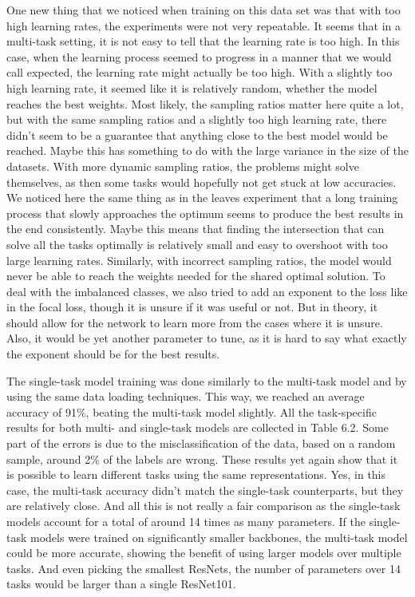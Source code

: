 One new thing that we noticed when training on this data set was that with too high learning rates, the experiments were not very repeatable.
It seems that in a multi-task setting, it is not easy to tell that the learning rate is too high.
In this case, when the learning process seemed to progress in a manner that we would call expected, the learning rate might actually be too high.
With a slightly too high learning rate, it seemed like it is relatively random, whether the model reaches the best weights.
Most likely, the sampling ratios matter here quite a lot, but with the same sampling ratios and a slightly too high learning rate, there didn't seem to be a guarantee that anything close to the best model would be reached.
Maybe this has something to do with the large variance in the size of the datasets.
With more dynamic sampling ratios, the problems might solve themselves, as then some tasks would hopefully not get stuck at low accuracies.
We noticed here the same thing as in the leaves experiment that a long training process that slowly approaches the optimum seems to produce the best results in the end consistently.
Maybe this means that finding the intersection that can solve all the tasks optimally is relatively small and easy to overshoot with too large learning rates.
Similarly, with incorrect sampling ratios, the model would never be able to reach the weights needed for the shared optimal solution.
To deal with the imbalanced classes, we also tried to add an exponent to the loss like in the focal loss, though it is unsure if it was useful or not.
But in theory, it should allow for the network to learn more from the cases where it is unsure.
Also, it would be yet another parameter to tune, as it is hard to say what exactly the exponent should be for the best results.

The single-task model training was done similarly to the multi-task model and by using the same data loading techniques.
This way, we reached an average accuracy of 91\%, beating the multi-task model slightly.
All the task-specific results for both multi- and single-task models are collected in Table 6.2.
Some part of the errors is due to the misclassification of the data, based on a random sample, around 2\% of the labels are wrong.
These results yet again show that it is possible to learn different tasks using the same representations.
Yes, in this case, the multi-task accuracy didn't match the single-task counterparts, but they are relatively close.
And all this is not really a fair comparison as the single-task models account for a total of around 14 times as many parameters.
If the single-task models were trained on significantly smaller backbones, the multi-task model could be more accurate, showing the benefit of using larger models over multiple tasks.
And even picking the smallest ResNets, the number of parameters over 14 tasks would be larger than a single ResNet101.

